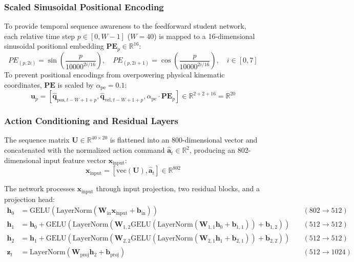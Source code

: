 \documentclass[11pt,a4paper]{article}
\begin{document}
\subsubsection{Scaled Sinusoidal Positional Encoding}
To provide temporal sequence awareness to the feedforward student network, each relative time step $p \in [0, W-1]$ ($W=40$) is mapped to a 16-dimensional sinusoidal positional embedding $\mathbf{PE}_p \in \mathbb{R}^{16}$:
\begin{equation}
    PE_{(p, 2i)} = \sin\left(\frac{p}{10000^{2i / 16}}\right), \quad PE_{(p, 2i+1)} = \cos\left(\frac{p}{10000^{2i / 16}}\right), \quad i \in [0, 7]
\end{equation}
To prevent positional encodings from overpowering physical kinematic coordinates, $\mathbf{PE}$ is scaled by $\alpha_{\text{pe}} = 0.1$:
\begin{equation}
    \mathbf{u}_{p} = [\hat{\mathbf{q}}_{\text{pos}, t-W+1+p}, \hat{\mathbf{q}}_{\text{vel}, t-W+1+p}, \alpha_{\text{pe}} \cdot \mathbf{PE}_p] \in \mathbb{R}^{2 + 2 + 16} = \mathbb{R}^{20}
\end{equation}

\subsubsection{Action Conditioning and Residual Layers}
The sequence matrix $\mathbf{U} \in \mathbb{R}^{40 \times 20}$ is flattened into an 800-dimensional vector and concatenated with the normalized action command $\hat{\mathbf{a}}_t \in \mathbb{R}^2$, producing an 802-dimensional input feature vector $\mathbf{x}_{\text{input}}$:
\begin{equation}
    \mathbf{x}_{\text{input}} = [\text{vec}(\mathbf{U}), \hat{\mathbf{a}}_t] \in \mathbb{R}^{802}
\end{equation}

The network processes $\mathbf{x}_{\text{input}}$ through input projection, two residual blocks, and a projection head:
\begin{align}
    \mathbf{h}_0 &= \text{GELU}\left(\text{LayerNorm}\left(\mathbf{W}_{\text{in}} \mathbf{x}_{\text{input}} + \mathbf{b}_{\text{in}}\right)\right) \quad &(802 \to 512) \\
    \mathbf{h}_1 &= \mathbf{h}_0 + \text{GELU}\left(\text{LayerNorm}\left(\mathbf{W}_{1,2} \text{GELU}(\text{LayerNorm}(\mathbf{W}_{1,1} \mathbf{h}_0 + \mathbf{b}_{1,1})) + \mathbf{b}_{1,2}\right)\right) \quad &(512 \to 512) \\
    \mathbf{h}_2 &= \mathbf{h}_1 + \text{GELU}\left(\text{LayerNorm}\left(\mathbf{W}_{2,2} \text{GELU}(\text{LayerNorm}(\mathbf{W}_{2,1} \mathbf{h}_1 + \mathbf{b}_{2,1})) + \mathbf{b}_{2,2}\right)\right) \quad &(512 \to 512) \\
    \mathbf{z}_t &= \text{LayerNorm}\left(\mathbf{W}_{\text{proj}} \mathbf{h}_2 + \mathbf{b}_{\text{proj}}\right) \quad &(512 \to 1024)
\end{align}
\end{document}
